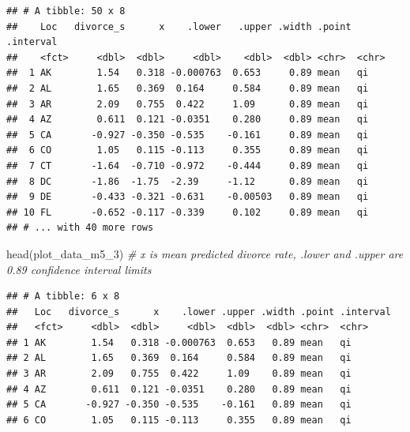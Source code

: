 \documentclass[
]{book}
\newenvironment{Shaded}{\begin{snugshade}}{\end{snugshade}}
\newcommand{\CommentTok}[1]{\textcolor[rgb]{0.56,0.35,0.01}{\textit{#1}}}
\newcommand{\FunctionTok}[1]{\textcolor[rgb]{0.00,0.00,0.00}{#1}}
\newcommand{\NormalTok}[1]{#1}
\begin{document}
\begin{verbatim}
## # A tibble: 50 x 8
##    Loc   divorce_s      x    .lower   .upper .width .point .interval
##    <fct>     <dbl>  <dbl>     <dbl>    <dbl>  <dbl> <chr>  <chr>    
##  1 AK        1.54   0.318 -0.000763  0.653     0.89 mean   qi       
##  2 AL        1.65   0.369  0.164     0.584     0.89 mean   qi       
##  3 AR        2.09   0.755  0.422     1.09      0.89 mean   qi       
##  4 AZ        0.611  0.121 -0.0351    0.280     0.89 mean   qi       
##  5 CA       -0.927 -0.350 -0.535    -0.161     0.89 mean   qi       
##  6 CO        1.05   0.115 -0.113     0.355     0.89 mean   qi       
##  7 CT       -1.64  -0.710 -0.972    -0.444     0.89 mean   qi       
##  8 DC       -1.86  -1.75  -2.39     -1.12      0.89 mean   qi       
##  9 DE       -0.433 -0.321 -0.631    -0.00503   0.89 mean   qi       
## 10 FL       -0.652 -0.117 -0.339     0.102     0.89 mean   qi       
## # ... with 40 more rows
\end{verbatim}

\begin{Shaded}
\begin{Highlighting}[]
\FunctionTok{head}\NormalTok{(plot\_data\_m5\_3) }\CommentTok{\# x is mean predicted divorce rate, .lower and .upper are 0.89 confidence interval limits}
\end{Highlighting}
\end{Shaded}

\begin{verbatim}
## # A tibble: 6 x 8
##   Loc   divorce_s      x    .lower .upper .width .point .interval
##   <fct>     <dbl>  <dbl>     <dbl>  <dbl>  <dbl> <chr>  <chr>    
## 1 AK        1.54   0.318 -0.000763  0.653   0.89 mean   qi       
## 2 AL        1.65   0.369  0.164     0.584   0.89 mean   qi       
## 3 AR        2.09   0.755  0.422     1.09    0.89 mean   qi       
## 4 AZ        0.611  0.121 -0.0351    0.280   0.89 mean   qi       
## 5 CA       -0.927 -0.350 -0.535    -0.161   0.89 mean   qi       
## 6 CO        1.05   0.115 -0.113     0.355   0.89 mean   qi
\end{verbatim}
\end{document}
